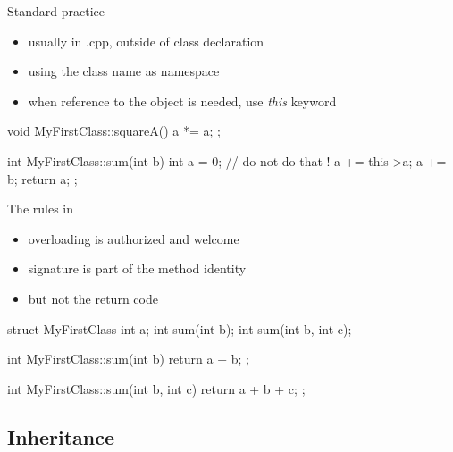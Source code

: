 \begin{frame}[fragile]
  \begin{block}{Standard practice}
    \begin{itemize}
    \item usually in .cpp, outside of class declaration
    \item using the class name as namespace
    \item when reference to the object is needed, use {\it this} keyword
    \end{itemize}
  \end{block}
  \begin{cppcode}
    void MyFirstClass::squareA() {
      a *= a;
    };

    int MyFirstClass::sum(int b) {
      int a = 0; // do not do that !
      a += this->a;
      a += b;
      return a;
    };
  \end{cppcode}
\end{frame}

\begin{frame}[fragile]
  \begin{block}{The rules in \cpp}
    \begin{itemize}
    \item overloading is authorized and welcome
    \item signature is part of the method identity
    \item but not the return code
    \end{itemize}
  \end{block}
  \begin{cppcode}
    struct MyFirstClass {
      int a;
      int sum(int b);
      int sum(int b, int c);
    }

    int MyFirstClass::sum(int b) { return a + b; };

    int MyFirstClass::sum(int b, int c) {
      return a + b + c;
    };
  \end{cppcode}
\end{frame}

\subsection{Inheritance}

